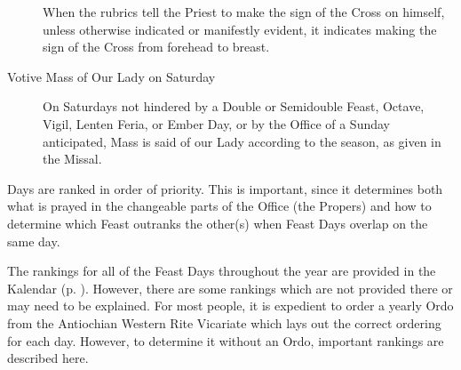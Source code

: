\begin{description}
    When the rubrics tell the Priest to make the sign of the Cross on himself, unless otherwise indicated or manifestly evident, it indicates making the sign of the Cross from forehead to breast.
    \item[Votive Mass of Our Lady on Saturday] On Saturdays not hindered by a Double or Semidouble Feast, Octave, Vigil, Lenten Feria, or Ember Day, or by the Office of a Sunday anticipated, Mass is said of our Lady according to the season, as given in the Missal.\par
\end{description}
\newpage
{}
{}\label{ranking}
\noindent
{} Days are ranked in order of priority. This is important, since it determines both what is prayed in the changeable parts of the Office (the Propers) and how to determine which Feast outranks the other(s) when Feast Days overlap on the same day.\par
The rankings for all of the Feast Days throughout the year are provided in the Kalendar (p. \pageref{kalendar}). However, there are some rankings which are not provided there or may need to be explained. For most people, it is expedient to order a yearly Ordo from the Antiochian Western Rite Vicariate which lays out the correct ordering for each day. However, to determine it without an Ordo, important rankings are described here.
